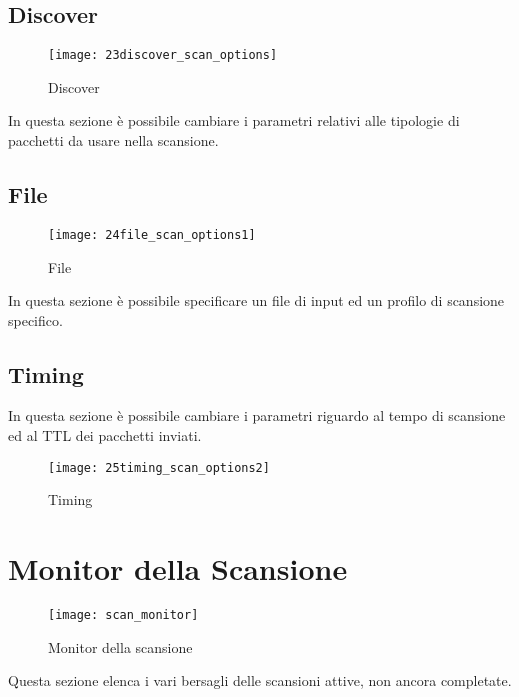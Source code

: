 \subsection{Discover}
\label{sec:ScanDiscover}

\begin{figure}[h]
  \centering
  \texttt{[image: 23discover\_scan\_options]}
  \caption{Discover}
  \label{fig:ScanDiscover}
\end{figure}
In questa sezione \`e possibile cambiare i parametri relativi alle tipologie di 
pacchetti da usare nella scansione.

\subsection{File}
\label{sec:ScanFile}

\begin{figure}[h]
  \centering
  \texttt{[image: 24file\_scan\_options1]}
  \caption{File}
  \label{fig:ScanFile}
\end{figure}
In questa sezione \`e possibile specificare un file di input ed un profilo 
di scansione specifico.

\subsection{Timing}
\label{sec:ScanTiming}

In questa sezione \`e possibile cambiare i parametri riguardo al tempo di 
scansione ed al TTL dei pacchetti inviati.
\begin{figure}[h]
  \centering
  \texttt{[image: 25timing\_scan\_options2]}
  \caption{Timing}
  \label{fig:ScanTiming}
\end{figure}


\section{Monitor della Scansione}
\label{sec:ScanMonitor}

\begin{figure}[h]
  \centering
  \texttt{[image: scan\_monitor]}
  \caption{Monitor della scansione}
  \label{fig:ScanMonitor}
\end{figure}
Questa sezione elenca i vari bersagli delle scansioni attive, non ancora 
completate.

